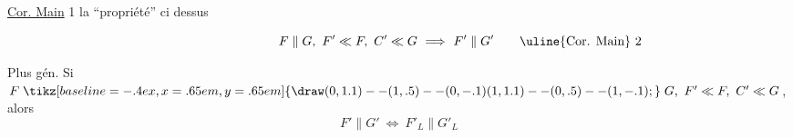 \uline{Cor. Main} 1 \quad la ``propriété'' ci dessus

\[
F\parallel G,\ F'\ll F,\ C'\ll G\ \Longrightarrow\ F'\parallel G'
\tag*{\makebox[0pt][r]{\makebox[\displaywidth][l]{\uline{Cor. Main} 2}}}
\]

Plus gén. \quad Si $F\mathrel{\tikz[baseline=-.4ex,x=.65em,y=.65em]{\draw (0,1.1)--(1,.5)--(0,-.1) (1,1.1)--(0,.5)--(1,-.1);}}G,\ F'\ll F,\ C'\ll G$, alors
\[
 F'\parallel G'\ \Longleftrightarrow\ F'_{L}\parallel G'_{L}
\]
